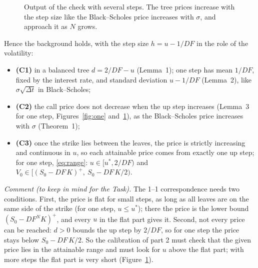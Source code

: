\documentclass[11pt,a4paper]{article}
\newcommand{\ansbox}[1]{\begin{ansboxenv}#1\end{ansboxenv}}
\begin{document}
\begin{figure}[!ht]
{}
\caption{Output of the check with several steps. The tree prices increase with the step size like the Black--Scholes price increases with $\sigma$, and approach it as $N$ grows.}
\label{fig:multi}
\end{figure}

\ansbox{Hence the background holds, with the step size $h=u-1/DF$ in the role of the volatility:
\begin{itemize}
\item \textbf{(C1)} in a balanced tree $d=2/DF-u$ (Lemma~1); one step has mean $1/DF$, fixed by the interest rate, and standard deviation $u-1/DF$ (Lemma~2), like $\sigma\sqrt{\Delta t}$ in Black--Scholes;
\item \textbf{(C2)} the call price does not decrease when the up step increases (Lemma~3 for one step, Figures~\ref{fig:one} and~\ref{fig:multi}), as the Black--Scholes price increases with $\sigma$ (Theorem~1);
\item \textbf{(C3)} once the strike lies between the leaves, the price is strictly increasing and continuous in $u$, so each attainable price comes from exactly one up step; for one step, \eqref{eq:range}: $u\in[u^*,2/DF)$ and $V_0\in[(S_0-DF\,K)^+,\ S_0-DF\,K/2)$.
\end{itemize}}

\noindent\emph{Comment (to keep in mind for the Task).} The 1--1 correspondence needs two conditions. First, the price is flat for small steps, as long as all leaves are on the same side of the strike (for one step, $u\le u^*$); there the price is the lower bound $(S_0-DF^N K)^+$, and every $u$ in the flat part gives it. Second, not every price can be reached: $d>0$ bounds the up step by $2/DF$, so for one step the price stays below $S_0-DF\,K/2$. So the calibration of part 2 must check that the given price lies in the attainable range and must look for $u$ above the flat part; with more steps the flat part is very short (Figure~\ref{fig:multi}).
\end{document}
